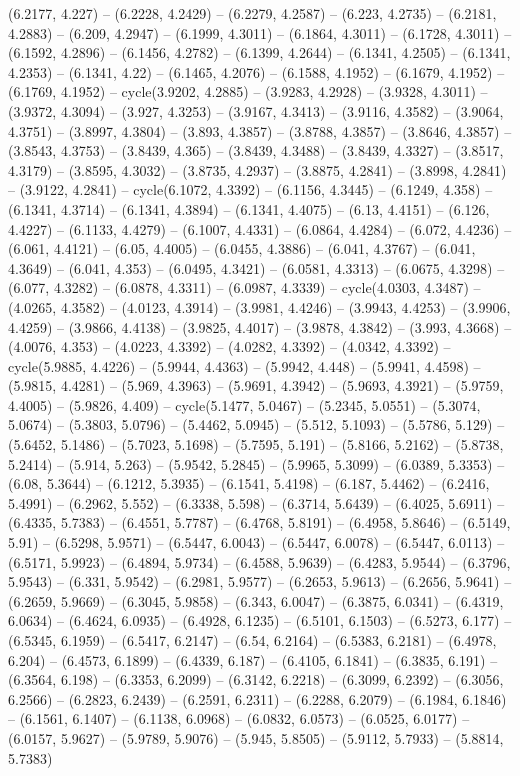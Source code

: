 (6.2177, 4.227) -- (6.2228, 4.2429) -- (6.2279, 4.2587) -- (6.223, 4.2735) -- (6.2181, 4.2883) -- (6.209, 4.2947) -- (6.1999, 4.3011) -- (6.1864, 4.3011) -- (6.1728, 4.3011) -- (6.1592, 4.2896) -- (6.1456, 4.2782) -- (6.1399, 4.2644) -- (6.1341, 4.2505) -- (6.1341, 4.2353) -- (6.1341, 4.22) -- (6.1465, 4.2076) -- (6.1588, 4.1952) -- (6.1679, 4.1952) -- (6.1769, 4.1952) -- cycle(3.9202, 4.2885) -- (3.9283, 4.2928) -- (3.9328, 4.3011) -- (3.9372, 4.3094) -- (3.927, 4.3253) -- (3.9167, 4.3413) -- (3.9116, 4.3582) -- (3.9064, 4.3751) -- (3.8997, 4.3804) -- (3.893, 4.3857) -- (3.8788, 4.3857) -- (3.8646, 4.3857) -- (3.8543, 4.3753) -- (3.8439, 4.365) -- (3.8439, 4.3488) -- (3.8439, 4.3327) -- (3.8517, 4.3179) -- (3.8595, 4.3032) -- (3.8735, 4.2937) -- (3.8875, 4.2841) -- (3.8998, 4.2841) -- (3.9122, 4.2841) -- cycle(6.1072, 4.3392) -- (6.1156, 4.3445) -- (6.1249, 4.358) -- (6.1341, 4.3714) -- (6.1341, 4.3894) -- (6.1341, 4.4075) -- (6.13, 4.4151) -- (6.126, 4.4227) -- (6.1133, 4.4279) -- (6.1007, 4.4331) -- (6.0864, 4.4284) -- (6.072, 4.4236) -- (6.061, 4.4121) -- (6.05, 4.4005) -- (6.0455, 4.3886) -- (6.041, 4.3767) -- (6.041, 4.3649) -- (6.041, 4.353) -- (6.0495, 4.3421) -- (6.0581, 4.3313) -- (6.0675, 4.3298) -- (6.077, 4.3282) -- (6.0878, 4.3311) -- (6.0987, 4.3339) -- cycle(4.0303, 4.3487) -- (4.0265, 4.3582) -- (4.0123, 4.3914) -- (3.9981, 4.4246) -- (3.9943, 4.4253) -- (3.9906, 4.4259) -- (3.9866, 4.4138) -- (3.9825, 4.4017) -- (3.9878, 4.3842) -- (3.993, 4.3668) -- (4.0076, 4.353) -- (4.0223, 4.3392) -- (4.0282, 4.3392) -- (4.0342, 4.3392) -- cycle(5.9885, 4.4226) -- (5.9944, 4.4363) -- (5.9942, 4.448) -- (5.9941, 4.4598) -- (5.9815, 4.4281) -- (5.969, 4.3963) -- (5.9691, 4.3942) -- (5.9693, 4.3921) -- (5.9759, 4.4005) -- (5.9826, 4.409) -- cycle(5.1477, 5.0467) -- (5.2345, 5.0551) -- (5.3074, 5.0674) -- (5.3803, 5.0796) -- (5.4462, 5.0945) -- (5.512, 5.1093) -- (5.5786, 5.129) -- (5.6452, 5.1486) -- (5.7023, 5.1698) -- (5.7595, 5.191) -- (5.8166, 5.2162) -- (5.8738, 5.2414) -- (5.914, 5.263) -- (5.9542, 5.2845) -- (5.9965, 5.3099) -- (6.0389, 5.3353) -- (6.08, 5.3644) -- (6.1212, 5.3935) -- (6.1541, 5.4198) -- (6.187, 5.4462) -- (6.2416, 5.4991) -- (6.2962, 5.552) -- (6.3338, 5.598) -- (6.3714, 5.6439) -- (6.4025, 5.6911) -- (6.4335, 5.7383) -- (6.4551, 5.7787) -- (6.4768, 5.8191) -- (6.4958, 5.8646) -- (6.5149, 5.91) -- (6.5298, 5.9571) -- (6.5447, 6.0043) -- (6.5447, 6.0078) -- (6.5447, 6.0113) -- (6.5171, 5.9923) -- (6.4894, 5.9734) -- (6.4588, 5.9639) -- (6.4283, 5.9544) -- (6.3796, 5.9543) -- (6.331, 5.9542) -- (6.2981, 5.9577) -- (6.2653, 5.9613) -- (6.2656, 5.9641) -- (6.2659, 5.9669) -- (6.3045, 5.9858) -- (6.343, 6.0047) -- (6.3875, 6.0341) -- (6.4319, 6.0634) -- (6.4624, 6.0935) -- (6.4928, 6.1235) -- (6.5101, 6.1503) -- (6.5273, 6.177) -- (6.5345, 6.1959) -- (6.5417, 6.2147) -- (6.54, 6.2164) -- (6.5383, 6.2181) -- (6.4978, 6.204) -- (6.4573, 6.1899) -- (6.4339, 6.187) -- (6.4105, 6.1841) -- (6.3835, 6.191) -- (6.3564, 6.198) -- (6.3353, 6.2099) -- (6.3142, 6.2218) -- (6.3099, 6.2392) -- (6.3056, 6.2566) -- (6.2823, 6.2439) -- (6.2591, 6.2311) -- (6.2288, 6.2079) -- (6.1984, 6.1846) -- (6.1561, 6.1407) -- (6.1138, 6.0968) -- (6.0832, 6.0573) -- (6.0525, 6.0177) -- (6.0157, 5.9627) -- (5.9789, 5.9076) -- (5.945, 5.8505) -- (5.9112, 5.7933) -- (5.8814, 5.7383) 